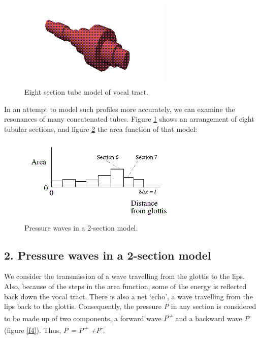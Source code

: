 
\begin{figure}[htbp]
\begin{center}
\includegraphics[width=0.65\textwidth]{mp/img/eight-section-model.png}
\caption{Eight section tube model of vocal tract.}
\label{f2}
\end{center}
\end{figure}

\newpage

In an attempt to model such profiles more accurately, we can examine the resonances of many concatenated tubes. Figure \ref{f2} shows an arrangement of eight tubular sections, and figure \ref{f3} the area function of that model:

\begin{figure}[htbp]
\begin{center}
\includegraphics[width=0.7\textwidth]{mp/img/eight-areas.png}
\caption{Pressure waves in a 2-section model.}
\label{f3}
\end{center}
\end{figure}

\vspace{-6mm}

\subsection*{2. Pressure waves in a 2-section model}

We consider the transmission of a wave travelling from the glottis to the lips. Also, because of the steps in the area function, some of the energy is reflected back down the vocal tract. There is also a net `echo', a wave travelling from the lips back to the glottis. Consequently, the pressure \textit{P} in any section is considered to be made up of two components, a forward wave \textit{P\textsuperscript{+}} and a backward wave \textit{P}\textsuperscript{-} (figure \ref{f4}). Thus, \textit{P = P\textsuperscript{+} +P}\textsuperscript{-}.

